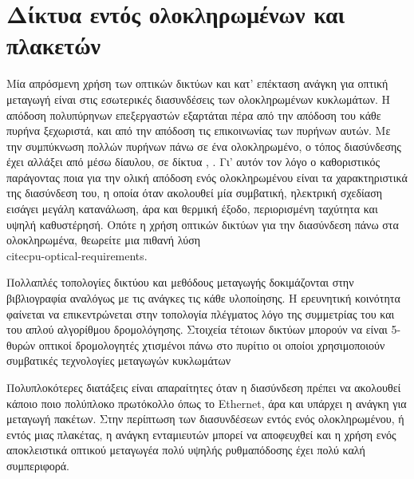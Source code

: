 \section{Δίκτυα εντός ολοκληρωμένων και πλακετών}

Μία απρόσμενη χρήση των οπτικών δικτύων και κατ' επέκταση ανάγκη για
οπτική μεταγωγή είναι στις εσωτερικές διασυνδέσεις των ολοκληρωμένων
κυκλωμάτων. Η απόδοση πολυπύρηνων επεξεργαστών εξαρτάται πέρα από την
απόδοση του κάθε πυρήνα ξεχωριστά, και από την απόδοση τις
επικοινωνίας των πυρήνων αυτών. Με την συμπύκνωση πολλών πυρήνων πάνω
σε ένα ολοκληρωμένο, ο τόπος διασύνδεσης έχει αλλάξει από μέσω
δίαυλου, σε δίκτυα \cite{cpu-nano-interconnect},
\cite{cpu-hp-switches}. Γι' αυτόν τον λόγο ο καθοριστικός παράγοντας
ποια για την ολική απόδοση ενός ολοκληρωμένου είναι τα χαρακτηριστικά
της διασύνδεση του, η οποία όταν ακολουθεί μία συμβατική, ηλεκτρική
σχεδίαση εισάγει μεγάλη κατανάλωση, άρα και θερμική έξοδο,
περιορισμένη ταχύτητα και υψηλή καθυστέρησή. Οπότε η χρήση οπτικών
δικτύων για την διασύνδεση πάνω στα ολοκληρωμένα, θεωρείτε μια πιθανή
λύση \\cite{cpu-optical-requirements}.

Πολλαπλές τοπολογίες δικτύου και μεθόδους μεταγωγής δοκιμάζονται στην
βιβλιογραφία αναλόγως με τις ανάγκες τις κάθε υλοποίησης. Η ερευνητική
κοινότητα φαίνεται να επικεντρώνεται στην τοπολογία πλέγματος λόγο της
συμμετρίας του και του απλού αλγορίθμου δρομολόγησης. Στοιχεία τέτοιων
δικτύων μπορούν να είναι 5-θυρών οπτικοί δρομολογητές χτισμένοι πάνω
στο πυρίτιο οι οποίοι χρησιμοποιούν συμβατικές τεχνολογίες μεταγωγών
κυκλωμάτων \cite{cpu-microring}

Πολυπλοκότερες διατάξεις είναι απαραίτητες όταν η διασύνδεση πρέπει να
ακολουθεί κάποιο ποιο πολύπλοκο πρωτόκολλο όπως το Ethernet, άρα και
υπάρχει η ανάγκη για μεταγωγή πακέτων. Στην περίπτωση των διασυνδέσεων
εντός ενός ολοκληρωμένου, ή εντός μιας πλακέτας, η ανάγκη ενταμιευτών
μπορεί να αποφευχθεί και η χρήση ενός αποκλειστικά οπτικού μεταγωγέα
πολύ υψηλής ρυθμαπόδοσης έχει πολύ καλή συμπεριφορά.\cite{6359293}

